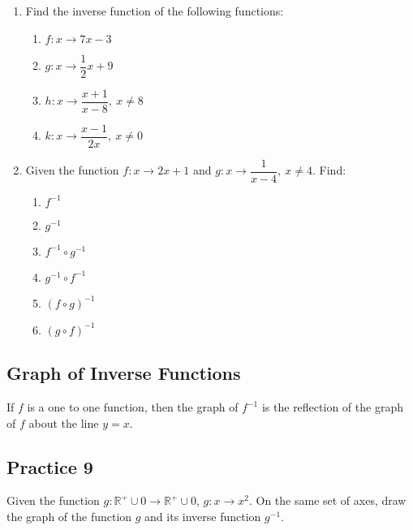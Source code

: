 \documentclass[12pt]{report}
\begin{document}
\begin{multicols}{2}

  \begin{enumerate}
    \item Find the inverse function of the following functions:
          \begin{enumerate}
            \item $f:x \to 7x - 3$
            \item $g:x \to \dfrac{1}{2}x + 9$
            \item $h:x \to \dfrac{x+1}{x-8},\ x \neq 8$
            \item $k:x \to \dfrac{x-1}{2x},\ x \neq 0$
          \end{enumerate}

    \item Given the function $f: x \to 2x+1$ and $g:x \to \dfrac{1}{x-4},\ x\neq 4$.
          Find:
          \begin{enumerate}
            \item $f^{-1}$
            \item $g^{-1}$
            \item $f^{-1} \circ g^{-1}$
            \item $g^{-1} \circ f^{-1}$
            \item $(f \circ g)^{-1}$
            \item $(g \circ f)^{-1}$
          \end{enumerate}
  \end{enumerate}

\end{multicols}

\subsection*{Graph of Inverse Functions}

\begin{mdframed}[style=MyFrame]
  If $f$ is a one to one function, then the graph of $f^{-1}$ is the reflection of the graph of $f$ about the line $y = x$.
\end{mdframed}

\subsection*{Practice 9}

Given the function $g: \mathbb{R}^+ \cup {0} \to \mathbb{R}^+ \cup {0}$, $g: x
  \to x^2$. On the same set of axes, draw the graph of the function $g$ and its
inverse function $g^{-1}$.
\end{document}
